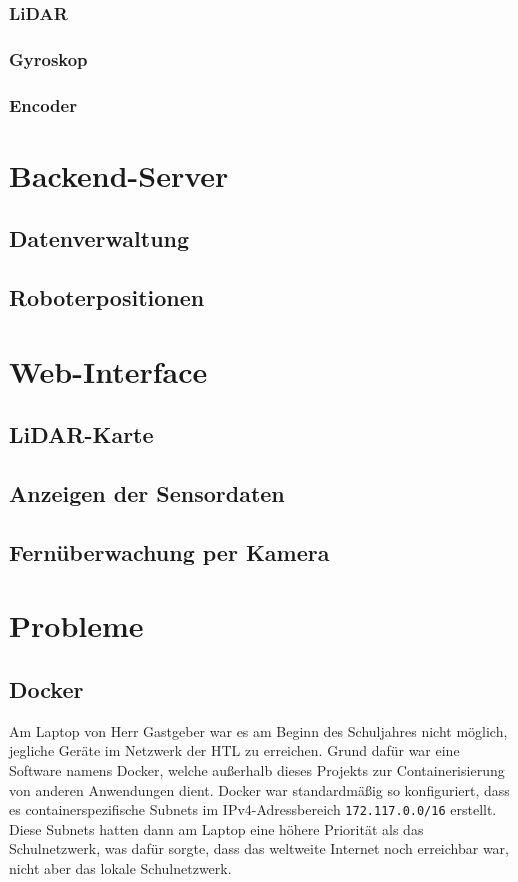\documentclass[12pt]{article}
\begin{document}
	\subsubsection{LiDAR}
	\label{lidar}
	\subsubsection{Gyroskop}
	\subsubsection{Encoder}
	\section{Backend-Server}
	\subsection{Datenverwaltung}
	\subsection{Roboterpositionen}
	\section{Web-Interface}
	\subsection{LiDAR-Karte}
	\subsection{Anzeigen der Sensordaten}
	\subsection{Fernüberwachung per Kamera}
	\section{Probleme}
	\subsection{Docker}
	Am Laptop von Herr Gastgeber war es am Beginn des Schuljahres nicht möglich,
	jegliche Geräte im Netzwerk der HTL zu erreichen.
	Grund dafür war eine Software namens Docker,
	welche außerhalb dieses Projekts zur Containerisierung von anderen Anwendungen dient.
	Docker war standardmäßig so konfiguriert,
	dass es containerspezifische Subnets im IPv4-Adressbereich \allowbreak\texttt{172.117.0.0/16} erstellt.
	Diese Subnets hatten dann am Laptop eine höhere Priorität als das Schulnetzwerk,
	was dafür sorgte,
	dass das weltweite Internet noch erreichbar war, 
	nicht aber das lokale Schulnetzwerk.
\end{document}
